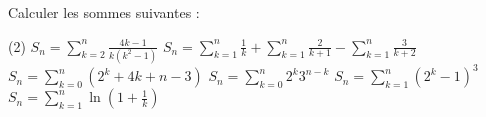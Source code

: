 %
%
Calculer les sommes suivantes :
	\begin{tasks}(2)
		\task $S_n = \sum\limits_{k=2}^n \frac{4k-1}{k(k^2-1)}$
		\task $S_n = \sum\limits_{k=1}^n \frac{1}{k} + \sum\limits_{k=1}^n\frac{2}{k+1} - \sum\limits_{k=1}^n\frac{3}{k+2}$	
		\task $S_n = \sum\limits_{k=0}^n (2^k + 4k +n -3)$
	    \task $S_n = \sum\limits_{k=0}^n 2^k3^{n-k}$
	    \task $S_n = \sum\limits_{k=1}^n (2^k-1)^3$
	     \task $S_n = \sum\limits_{k=1}^n \ln (1 + \frac{1}{k})$
	\end{tasks}
